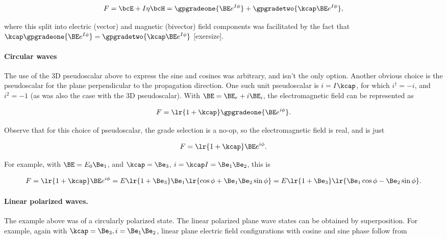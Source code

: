 \begin{equation}\label{eqn:ellipticalWaves:220}
F = \bcE + I \eta \bcH
=
\gpgradeone{ \BE e^{I \phi } } +
\gpgradetwo{ \kcap \BE e^{I \phi } },
\end{equation}

where this split into electric (vector) and magnetic (bivector) field components was facilitated by
the fact that
\( \kcap \gpgradeone{ \BE e^{I \phi } } = \gpgradetwo{ \kcap \BE e^{I \phi } } \) [exersize].

\paragraph{Circular waves}

The use of the 3D pseudoscalar above to express the sine and cosines was arbitrary, and isn't the only option.  Another obvious choice is the pseudoscalar for the plane perpendicular to the propagation direction.  One such unit pseudoscalar is \( i = I \kcap \), for which \( i^\dagger = -i \), and \( i^2 = -1 \) (as was also the case with the 3D pseudoscalar).
With \( \BE = \BE_r + i \BE_i \), the electromagnetic field can be represented as

\begin{dmath}\label{eqn:ellipticalWaves:240}
F
=
\lr{ 1 + \kcap } \gpgradeone{ \BE e^{i \phi } }.
\end{dmath}

Observe that for this choice of pseudoscalar, the grade selection is a no-op, so the electromagnetic field is real, and is just

\begin{dmath}\label{eqn:ellipticalWaves:260}
F
=
\lr{ 1 + \kcap } \BE e^{i \phi }.
\end{dmath}

For example, with \( \BE = E_0 \Be_1 \), and \( \kcap = \Be_3 \), \( i = \kcap I = \Be_1 \Be_2 \), this is

\begin{dmath}\label{eqn:ellipticalWaves:280}
F
=
\lr{ 1 + \kcap } \BE e^{i \phi }
=
E \lr{ 1 + \Be_3 } \Be_1 \lr{ \cos\phi + \Be_1 \Be_2 \sin\phi }
=
E \lr{ 1 + \Be_3 } \lr{ \Be_1 \cos\phi - \Be_2 \sin\phi }.
\end{dmath}

\paragraph{Linear polarized waves.}

The example above was of a circularly polarized state.  The linear polarized plane wave states can be obtained by superposition.  For example, again with \( \kcap = \Be_3, i = \Be_1 \Be_2 \), linear plane electric field configurations with cosine and sine phase follow from

